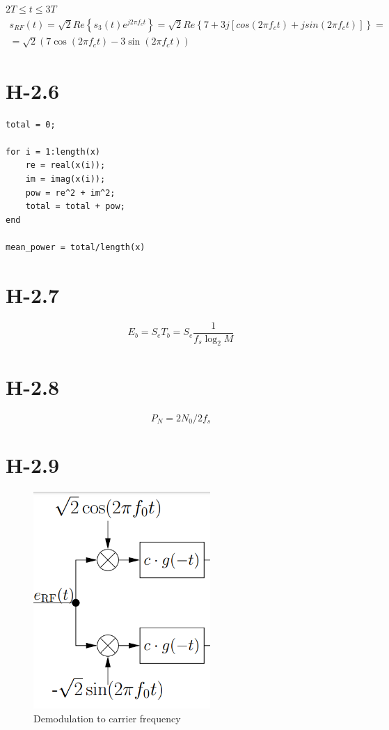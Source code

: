 \documentclass{article}
\begin{document}
$2T\le t \le 3T$
\begin{align}
    s_{RF}(t) = \sqrt{2}Re\left\{s_3(t)e^{j2\pi f_{c}t}\right\} = \sqrt{2} Re\left\{7+3j[cos(2\pi f_{c}t) + j sin(2\pi f_{c}t)]\right\} = \\\nonumber
    = \sqrt{2}(7\cos(2\pi f_{c}t) - 3\sin(2\pi f_{c}t))
\end{align}

\section{H-2.6}

\begin{verbatim}
total = 0;

for i = 1:length(x)
    re = real(x(i));
    im = imag(x(i));
    pow = re^2 + im^2; 
    total = total + pow;
end

mean_power = total/length(x)
\end{verbatim}

\section{H-2.7}
\begin{equation}
    E_{b} = S_{e} T_{b} = S_{e} \frac{1}{f_{s} \log_{2}M}
\end{equation}

\section{H-2.8}

\begin{equation}
    P_N = 2 N_0/2 f_s
\end{equation}

\section{H-2.9}

\begin{figure}[h]
\centering
\includegraphics[width=0.6\textwidth]{demodulation.png}
\caption{Demodulation to carrier frequency}
\label{fig:demodulation}
\end{figure}
\end{document}

